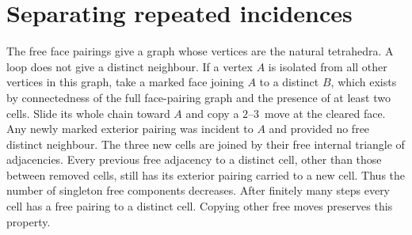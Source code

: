 \documentclass[11pt]{amsart}
\newcommand{\moveup}{\(2\)--\(3\)}
\begin{document}
\section{Separating repeated incidences}\label{sec:normalize}

The free face pairings give a graph whose vertices are the natural
tetrahedra. A loop does not give a distinct neighbour. If a vertex
\(A\) is isolated from all other vertices in this graph, take a marked
face joining \(A\) to a distinct \(B\), which exists by connectedness
of the full face-pairing graph and the presence of at least two cells.
Slide its whole chain toward \(A\) and copy a \moveup\ move at the
cleared face. Any newly marked exterior pairing was incident to \(A\)
and provided no free distinct neighbour. The three new cells are
joined by their free internal triangle of adjacencies. Every previous
free adjacency to a distinct cell, other than those between removed
cells, still has its exterior pairing carried to a new cell. Thus the
number of singleton free components decreases. After finitely many
steps every cell has a free pairing to a distinct cell. Copying other
free moves preserves this property.
\end{document}
